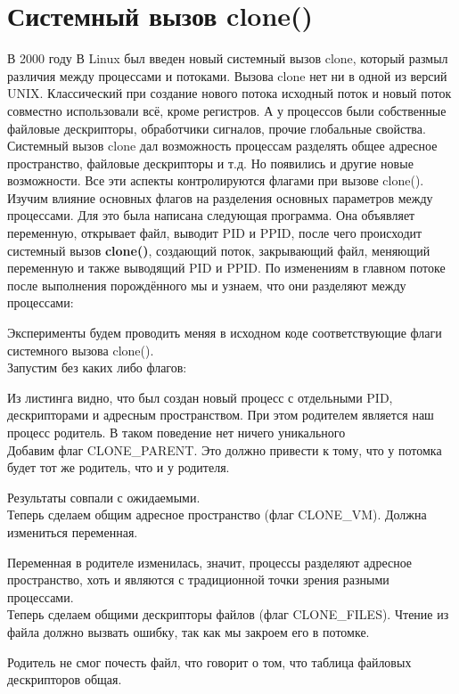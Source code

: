 \documentclass[a4paper]{article}
\begin{document}
	\section{Системный вызов clone()}
	В 2000 году В Linux был введен новый системный вызов clone, который размыл различия между процессами и потоками. Вызова clone нет ни в одной из версий UNIX. Классический при создание нового потока исходный поток и новый поток совместно использовали всё, кроме регистров. А у процессов были собственные файловые дескрипторы, обработчики сигналов, прочие глобальные свойства. Системный вызов clone дал возможность процессам разделять общее адресное пространство, файловые дескрипторы и т.д. Но появились и другие новые возможности. Все эти аспекты контролируются флагами при вызове clone().\\
	Изучим влияние основных флагов на разделения основных параметров между процессами. Для это была написана следующая программа. Она объявляет переменную, открывает файл, выводит PID и PPID, после чего происходит системный вызов \textbf{clone()}, создающий поток, закрывающий файл, меняющий переменную и также выводящий PID и PPID. По изменениям в главном потоке после выполнения порождённого мы и узнаем, что они разделяют между процессами:


	
	Эксперименты будем проводить меняя в исходном коде соответствующие флаги системного вызова clone().\\		Запустим без каких либо флагов:
	
	Из листинга видно, что был создан новый процесс с отдельными PID, дескрипторами и адресным пространством. При этом родителем является наш процесс родитель. В таком поведение нет ничего уникального\\
	
	Добавим флаг CLONE\_PARENT. Это должно привести к тому, что у потомка будет тот же родитель, что и у родителя.
	
	Результаты совпали с ожидаемыми.\\

	Теперь сделаем общим адресное пространство (флаг CLONE\_VM). Должна измениться переменная.	
	
	Переменная в родителе изменилась, значит, процессы разделяют адресное пространство, хоть и являются с традиционной точки зрения разными процессами.\\

	Теперь сделаем общими дескрипторы файлов (флаг CLONE\_FILES). Чтение из файла должно вызвать ошибку, так как мы закроем его в потомке.
	
	Родитель не смог почесть файл, что говорит о том, что таблица файловых дескрипторов общая.\\
\end{document}
